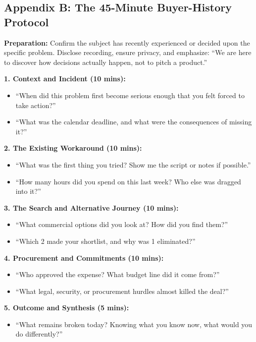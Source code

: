 \subsection*{Appendix B: The 45-Minute Buyer-History Protocol}

\noindent\textbf{Preparation:} Confirm the subject has recently experienced or decided upon the specific problem. Disclose recording, ensure privacy, and emphasize: ``We are here to discover how decisions actually happen, not to pitch a product.''

\noindent\textbf{1. Context and Incident (10 mins):}
\begin{itemize}[leftmargin=1.2em,itemsep=0.2ex]
  \item ``When did this problem first become serious enough that you felt forced to take action?''
  \item ``What was the calendar deadline, and what were the consequences of missing it?''
\end{itemize}

\noindent\textbf{2. The Existing Workaround (10 mins):}
\begin{itemize}[leftmargin=1.2em,itemsep=0.2ex]
  \item ``What was the first thing you tried? Show me the script or notes if possible.''
  \item ``How many hours did you spend on this last week? Who else was dragged into it?''
\end{itemize}

\noindent\textbf{3. The Search and Alternative Journey (10 mins):}
\begin{itemize}[leftmargin=1.2em,itemsep=0.2ex]
  \item ``What commercial options did you look at? How did you find them?''
  \item ``Which 2 made your shortlist, and why was 1 eliminated?''
\end{itemize}

\noindent\textbf{4. Procurement and Commitments (10 mins):}
\begin{itemize}[leftmargin=1.2em,itemsep=0.2ex]
  \item ``Who approved the expense? What budget line did it come from?''
  \item ``What legal, security, or procurement hurdles almost killed the deal?''
\end{itemize}

\noindent\textbf{5. Outcome and Synthesis (5 mins):}
\begin{itemize}[leftmargin=1.2em,itemsep=0.2ex]
  \item ``What remains broken today? Knowing what you know now, what would you do differently?''
\end{itemize}

